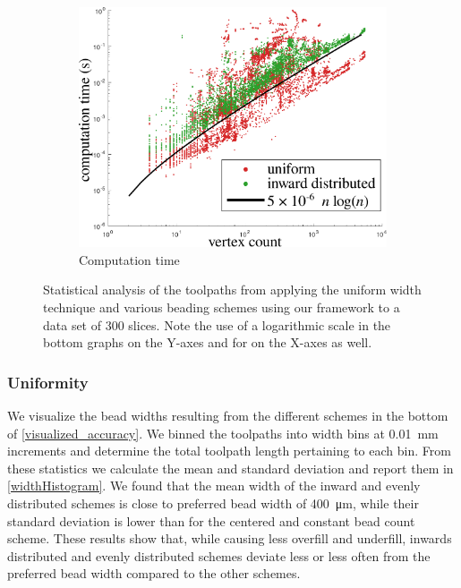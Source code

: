 \begin{figure}
\begin{subfigure}{\figwidth}
\includegraphics[height=\figheight]{sources-validation-computime2.pdf}
\caption{Computation time}
\label{computime}
\end{subfigure}


\caption{
Statistical analysis of the toolpaths from applying the uniform width technique and various beading schemes using our framework to a data set of 300 slices.
Note the use of a logarithmic scale {in the bottom graphs }on the Y-axes and {for  on} the X-axes as well.
}
\label{statisticsfig}
\end{figure}







\subsubsection{Uniformity}
We visualize the bead widths resulting from the different schemes in the bottom of \cref{visualized_accuracy}.
{
We binned the toolpaths into width bins at \SI{0.01}{\milli\meter} increments and determine the total toolpath length pertaining to each bin.
From these statistics we calculate the mean and standard deviation and report them in \cref{widthHistogram}.
}
We found that the mean width of the inward and evenly distributed schemes is close to preferred bead width of \SI{400}{\micro\meter}, while their standard deviation is lower than for the centered and constant bead count scheme. 
These results show that, while causing less overfill and underfill, inwards distributed and evenly distributed schemes deviate less or less often from the preferred bead width compared to the other schemes.


